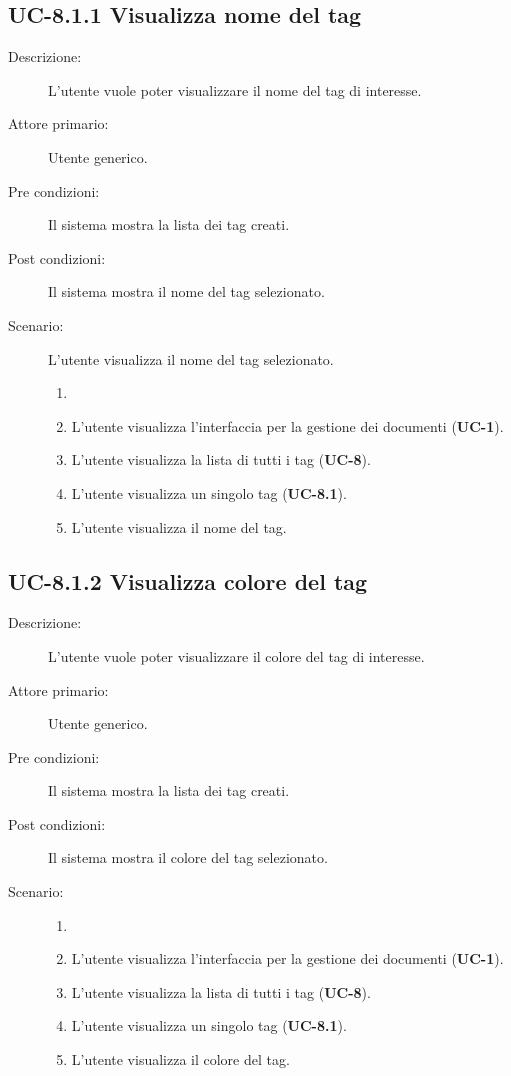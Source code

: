 \subsection{UC-8.1.1 Visualizza nome del tag}
\begin{description}
    \item[Descrizione:] L’utente vuole poter visualizzare il nome del tag di interesse.
    \item[Attore primario:] Utente generico.
    \item[Pre condizioni:] Il sistema mostra la lista dei tag creati.
    \item[Post condizioni:] Il sistema mostra il nome del tag selezionato.
    \item[Scenario:] L'utente visualizza il nome del tag selezionato.
    \begin{enumerate}
        \item[] 
        \item L’utente visualizza l'interfaccia per la gestione dei documenti (\textbf{UC-1}).
        \item L’utente visualizza la lista di tutti i tag (\textbf{UC-8}).
        \item L'utente visualizza un singolo tag (\textbf{UC-8.1}).
        \item L'utente visualizza il nome del tag.
    \end{enumerate}
\end{description}

\subsection{UC-8.1.2 Visualizza colore del tag}
\begin{description}
    \item[Descrizione:] L’utente vuole poter visualizzare il colore del tag di interesse.
    \item[Attore primario:] Utente generico.
    \item[Pre condizioni:] Il sistema mostra la lista dei tag creati.
    \item[Post condizioni:] Il sistema mostra il colore del tag selezionato.
    \item[Scenario:] 
    \begin{enumerate}
        \item[] 
        \item L’utente visualizza l'interfaccia per la gestione dei documenti (\textbf{UC-1}).
        \item L’utente visualizza la lista di tutti i tag (\textbf{UC-8}).
        \item L'utente visualizza un singolo tag (\textbf{UC-8.1}).
        \item L'utente visualizza il colore del tag.
    \end{enumerate}
\end{description}

